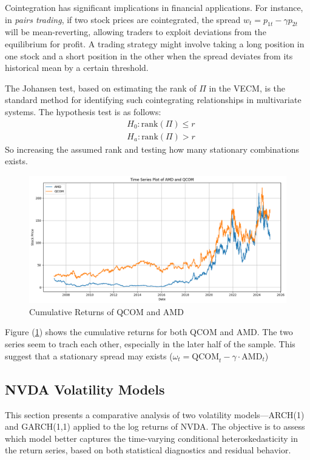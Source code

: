 \documentclass[12pt]{article}
\begin{document}
Cointegration has significant implications in financial applications. For instance, in \textit{pairs trading}, if two stock prices are cointegrated, the spread \( w_t = p_{1t} - \gamma p_{2t} \) will be mean-reverting, allowing traders to exploit deviations from the equilibrium for profit. A trading strategy might involve taking a long position in one stock and a short position in the other when the spread deviates from its historical mean by a certain threshold. 

The Johansen test, based on estimating the rank of \( \Pi \) in the VECM, is the standard method for identifying such cointegrating relationships in multivariate systems. The hypothesis test is as follows:
\begin{equation}
	\begin{aligned}
		&H_0:\text{rank}(\Pi)\leq r\\
		&H_a:\text{rank}(\Pi)>r
	\end{aligned}
\end{equation}
So increasing the assumed rank and testing how many stationary combinations exists. 

\begin{figure}[!h]
	\centering
	\includegraphics[width=0.8\linewidth]{plots/QCOM_AMD.png}
	\caption{Cumulative Returns of QCOM and AMD}
	\label{fig:amd_qcom_cumul_returns}
\end{figure}
Figure (\ref{fig:amd_qcom_cumul_returns}) shows the cumulative returns for both QCOM and AMD. The two series seem to trach each other, especially in the later half of the sample. This suggest that a stationary spread may exists ($\omega_t=\text{QCOM}_t-\gamma\cdot\text{AMD}_t$)

\newpage

\subsection*{NVDA Volatility Models}

This section presents a comparative analysis of two volatility models—ARCH(1) and GARCH(1,1) applied to the log returns of NVDA. The objective is to assess which model better captures the time-varying conditional heteroskedasticity in the return series, based on both statistical diagnostics and residual behavior.
\end{document}
